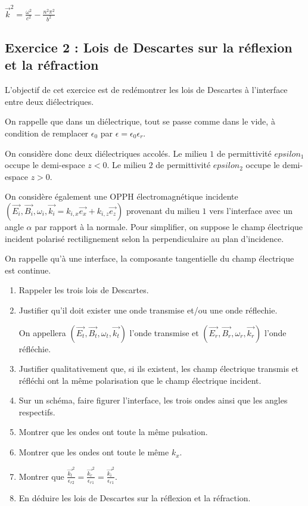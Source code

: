  $\vec{k}^2 = \frac{\omega^2}{c^2} - \frac{n^2 \pi^2}{b^2}$

\subsection{Exercice 2 : Lois de Descartes sur la réflexion et la réfraction}

L'objectif de cet exercice est de redémontrer les lois de Descartes à l'interface entre deux diélectriques.

On rappelle que dans un diélectrique, tout se passe comme dans le vide, à condition de remplacer $\epsilon_0$ par $\epsilon = \epsilon_0 \epsilon_r$.

On considère donc deux diélectriques accolés. Le milieu $1$ de permittivité $epsilon_1$ occupe le demi-espace $z<0$. Le milieu $2$ de permittivité $epsilon_2$ occupe le demi-espace $z>0$.

On considère également une OPPH électromagnétique incidente $(\vec{E_i}, \vec{B_i}, \omega_i, \vec{k_i} = k_{i,x}\vec{e_x} + k_{i, z}\vec{e_z})$ provenant du milieu $1$ vers l'interface avec un angle $\alpha$ par rapport à la normale. Pour simplifier, on suppose le champ électrique incident polarisé rectilignement selon la perpendiculaire au plan d'incidence.

On rappelle qu'à une interface, la composante tangentielle du champ électrique est continue.

\begin{enumerate}
	\item Rappeler les trois lois de Descartes.
	
	\item Justifier qu'il doit exister une onde transmise et/ou une onde réflechie. 
	
	On appellera $(\vec{E_t}, \vec{B_t}, \omega_t, \vec{k_t})$ l'onde transmise et $(\vec{E_r}, \vec{B_r}, \omega_r, \vec{k_r})$ l'onde réfléchie. 
	
	\item Justifier qualitativement que, si ils existent, les champ électrique transmis et réfléchi ont la même polarisation que le champ électrique incident.
	
	\item Sur un schéma, faire figurer l'interface, les trois ondes ainsi que les angles respectifs.
	
	\item Montrer que les ondes ont toute la même pulsation.
	
	\item Montrer que les ondes ont toute le même $k_x$.
	
	\item Montrer que $\frac{\vec{k_t}^2}{\epsilon_{r2}} = \frac{\vec{k_r}^2}{\epsilon_{r1}} = \frac{\vec{k_i}^2}{\epsilon_{r1}}$.
	
	\item En déduire les lois de Descartes sur la réflexion et la réfraction.
\end{enumerate}

